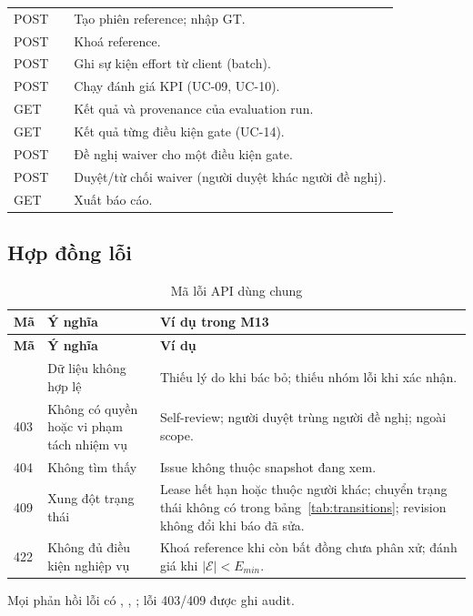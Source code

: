\begin{xltabular}{\linewidth}{@{}L{1.4cm}L{5.2cm}Y@{}}
POST &  & Tạo phiên reference; nhập GT.\\
POST &  & Khoá reference.\\
POST &  & Ghi sự kiện effort từ client (batch).\\
POST &  & Chạy đánh giá KPI (UC-09, UC-10).\\
GET &  & Kết quả và provenance của evaluation run.\\
GET &  & Kết quả từng điều kiện gate (UC-14).\\
POST &  & Đề nghị waiver cho một điều kiện gate.\\
POST &  & Duyệt/từ chối waiver (người duyệt khác người đề nghị).\\
GET &  & Xuất báo cáo.\\
\end{xltabular}

\subsection{Hợp đồng lỗi}
\begin{xltabular}{\linewidth}{@{}L{1.4cm}L{4.2cm}Y@{}}
\caption{Mã lỗi API dùng chung}\label{tab:apierrors}\\
\toprule
\textbf{Mã} & \textbf{Ý nghĩa} & \textbf{Ví dụ trong M13}\\
\midrule
\endfirsthead
\toprule \textbf{Mã} & \textbf{Ý nghĩa} & \textbf{Ví dụ}\\ \midrule
\endhead
\bottomrule
{} & Dữ liệu không hợp lệ & Thiếu lý do khi bác bỏ; thiếu nhóm lỗi khi xác nhận.\\
403 & Không có quyền hoặc vi phạm tách nhiệm vụ & Self-review; người duyệt trùng người đề nghị; ngoài scope.\\
404 & Không tìm thấy & Issue không thuộc snapshot đang xem.\\
409 & Xung đột trạng thái & Lease hết hạn hoặc thuộc người khác; chuyển trạng thái không có trong bảng~\ref{tab:transitions}; revision không đổi khi báo đã sửa.\\
422 & Không đủ điều kiện nghiệp vụ & Khoá reference khi còn bất đồng chưa phân xử; đánh giá khi \(|\mathcal{E}| < E_{min}\).\\
\end{xltabular}
Mọi phản hồi lỗi có , , ; lỗi 403/409
được ghi audit.


